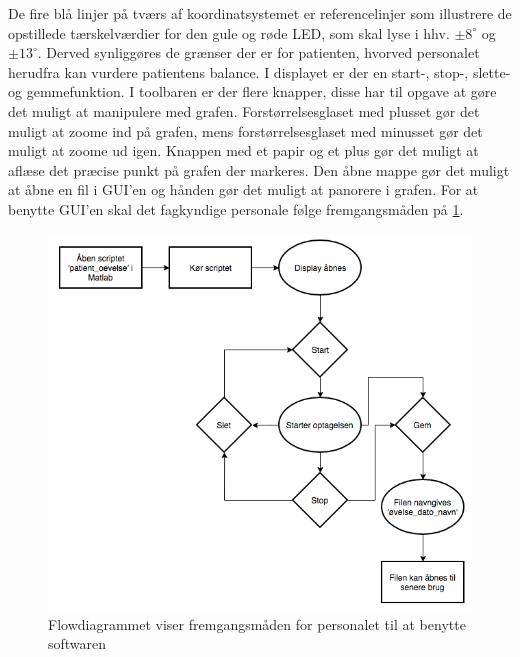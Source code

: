 De fire blå linjer på tværs af koordinatsystemet er referencelinjer som illustrere de opstillede tærskelværdier for den gule og røde LED, som skal lyse i hhv. $\pm 8^{\circ}$ og $\pm 13^{\circ}$. Derved synliggøres de grænser der er for patienten, hvorved personalet herudfra kan vurdere patientens balance. I displayet er der en start-, stop-, slette- og gemmefunktion.
I toolbaren er der flere knapper, disse har til opgave at gøre det muligt at manipulere med grafen. Forstørrelsesglaset med plusset gør det muligt at zoome ind på grafen, mens forstørrelsesglaset med minusset gør det muligt at zoome ud igen. Knappen med et papir og et plus gør det muligt at aflæse det præcise punkt på grafen der markeres. Den åbne mappe gør det muligt at åbne en fil i GUI'en og hånden gør det muligt at panorere i grafen.
For at benytte GUI'en skal det fagkyndige personale følge fremgangsmåden på \ref{Fig:fremgangsmåde_software}.
\begin{figure}[H] 
	\centering 
	\includegraphics[scale=0.5]{figures/cProblemloesning/Software_flowdiagram.PNG}
	\caption{Flowdiagrammet viser fremgangsmåden for personalet til at benytte softwaren}
	\label{Fig:fremgangsmåde_software}
\end{figure}

